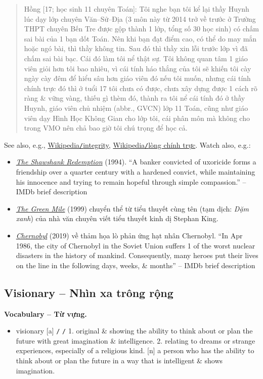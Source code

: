 \documentclass[12pt,oneside]{book}
\begin{document}
\begin{quote}
	{\sf Hồng [17; học sinh 11 chuyên Toán]}: Tôi nghe bạn tôi kể lại thầy Huynh lúc dạy lớp chuyên Văn--Sử--Địa (3 môn này từ 2014 trở về trước ở Trường THPT chuyên Bến Tre được gộp thành 1 lớp, tổng số 30 học sinh) có chấm sai bài của 1 bạn dốt Toán. Nên khi bạn đạt điểm cao, có thể do may mắn hoặc ngó bài, thì thầy không tin. Sau đó thì thầy xin lỗi trước lớp vì đã chấm sai bài bạc. Cái đó làm tôi nể thật sự. Tôi không quan tâm 1 giáo viên giỏi hơn tôi bao nhiêu, vì cái tính háo thắng của tôi sẽ khiến tôi cày ngày cày đêm để hiểu sâu hơn giáo viên đó nếu tôi muốn, nhưng cái tính chính trực đó thì ở tuổi 17 tôi chưa có được, chưa xây dựng được 1 cách rõ ràng \& vững vàng, thiếu gì thèm đó, thành ra tôi nể cái tính đó ở thầy Huynh, giáo viên chủ nhiệm (abbr., GVCN) lớp 11 Toán, cũng như giáo viên dạy Hình Học Không Gian cho lớp tôi, cái phân môn mà không cho trong VMO nên chả bao giờ tôi chú trọng để học cả.
\end{quote}
See also, e.g., \href{https://en.wikipedia.org/wiki/Integrity}{Wikipedia{\tt/}integrity}, \href{https://vi.wikipedia.org/wiki/L%C3%B2ng_ch%C3%ADnh_tr%E1%BB%B1c}{Wikipedia{\tt/}lòng chính trực}. Watch also, e.g.:
\begin{itemize}
	\item \href{https://www.imdb.com/title/tt0111161}{\it The Shawshank Redemption} (1994). ``A banker convicted of uxoricide forms a friendship over a quarter century with a hardened convict, while maintaining his innocence and trying to remain hopeful through simple compassion.'' -- {\sf IMDb brief description}
	\item \href{https://www.imdb.com/title/tt0120689}{\it The Green Mile} (1999) chuyển thể từ tiểu thuyết cùng tên (tạm dịch: {\it Dặm xanh}) của nhà văn chuyên viết tiểu thuyết kinh dị {\sc Stephan King}.
	\item \href{https://www.imdb.com/title/tt7366338/}{\it Chernobyl} (2019) về thảm họa lò phản ứng hạt nhân Chernobyl. ``In Apr 1986, the city of Chernobyl in the Soviet Union suffers 1 of the worst nuclear disasters in the history of mankind. Consequently, many heroes put their lives on the line in the following days, weeks, \& months'' -- {\sf IMDb brief description}
\end{itemize}

\subsection{Visionary -- Nhìn xa trông rộng}
\textbf{\textsf{\small Vocabulary -- Từ vựng.}}
\begin{itemize}\small
	\item {\sf visionary} [a] {\tt/} {\tt/} 1. original \& showing the ability to think about or plan the future with great imagination \& intelligence. 2. relating to dreams or strange experiences, especially of a religious kind. [n] a person who has the ability to think about or plan the future in a way that is intelligent \& shows imagination.
\end{itemize}
\end{document}
